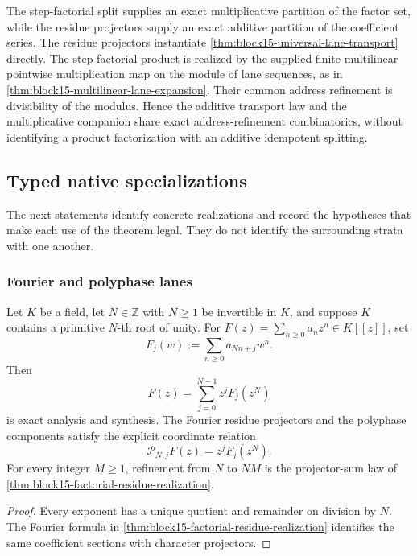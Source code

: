 \begin{corollary}
\label{cor:block15-factorial-genealogy}
The step-factorial split supplies an exact multiplicative partition of the
factor set, while the residue projectors supply an exact additive partition of
the coefficient series.  The residue projectors instantiate
\cref{thm:block15-universal-lane-transport} directly.  The step-factorial
product is realized by the supplied finite multilinear pointwise
multiplication map on the module of lane sequences, as in
\cref{thm:block15-multilinear-lane-expansion}.  Their common address
refinement is divisibility of the modulus.  Hence the additive transport law
and the multiplicative companion share exact address-refinement
combinatorics, without identifying a product factorization with an additive
idempotent splitting.
\end{corollary}

\subsection{Typed native specializations}
\label{subsec:block15-specializations}

The next statements identify concrete realizations and record the hypotheses
that make each use of the theorem legal.  They do not identify the surrounding
strata with one another.

\subsubsection{Fourier and polyphase lanes}

\begin{proposition}
\label{prop:block15-polyphase-specialization}
Let \(K\) be a field, let \(N\in\mathbb Z\) with \(N\ge1\) be invertible in \(K\), and suppose
\(K\) contains a primitive \(N\)-th root of unity.  For
\(F(z)=\sum_{n\ge0}a_nz^n\in K[[z]]\), set
\[
 F_j(w):=\sum_{n\ge0}a_{Nn+j}w^n.
\]
Then
\[
 F(z)=\sum_{j=0}^{N-1}z^jF_j(z^N)
\]
is exact analysis and synthesis.  The Fourier residue projectors and the
polyphase components satisfy the explicit coordinate relation
\[
 \mathcal P_{N,j}F(z)=z^jF_j(z^N).
\]
For every integer \(M\ge1\), refinement from \(N\) to \(NM\) is the
projector-sum law of
\cref{thm:block15-factorial-residue-realization}.
\end{proposition}

\begin{proof}
Every exponent has a unique quotient and remainder on division by \(N\).
The Fourier formula in
\cref{thm:block15-factorial-residue-realization} identifies the same
coefficient sections with character projectors.
\end{proof}

